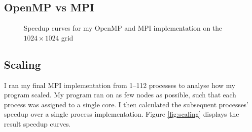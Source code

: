 \documentclass[twocolumn, a4paper]{article}
\begin{document}
\subsection{OpenMP vs MPI}

\begin{figure}[htpb]
  \centering
  \caption{Speedup curves for my OpenMP and MPI implementation on the $1024\times1024$ grid}\label{fig:scaling_openmp_mpi}
\end{figure}

\subsection{Scaling}

I ran my final MPI implementation from 1--112 processes to analyse how my program scaled.
My program ran on as few nodes as possible, such that each process was assigned to a single core. 
I then calculated the subsequent processes' speedup over a single process implementation.
Figure \ref{fig:scaling} displays the result speedup curves.
\end{document}
